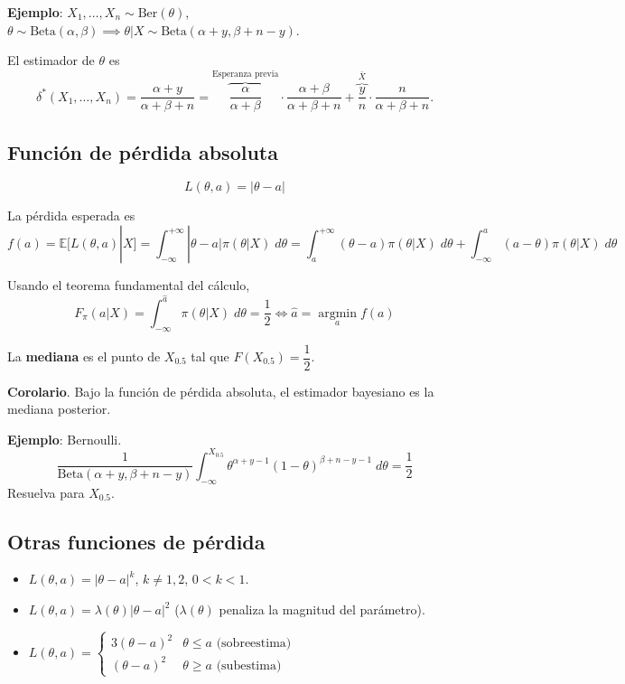 \documentclass[
  12pt,
]{book}
\begin{document}
\textbf{Ejemplo}: \(X_1,\dots, X_n \sim \text{Ber}(\theta)\), \(\theta \sim \text{Beta}(\alpha,\beta) \implies \theta|X \sim \text{Beta}(\alpha+y,\beta+n-y)\).

El estimador de \(\theta\) es
\[ \delta^*(X_1,\dots, X_n) = \dfrac{\alpha+y}{\alpha + \beta + n} = \overbrace{\dfrac{\alpha}{\alpha + \beta} }^{\text{Esperanza previa}}\cdot \dfrac{\alpha +\beta}{\alpha +\beta + n} + \overbrace{\dfrac{y}{n}}^{\bar X}\cdot \dfrac{n}{\alpha +\beta + n}.  \]

\hypertarget{funciuxf3n-de-puxe9rdida-absoluta}{%
\subsection{Función de pérdida absoluta}\label{funciuxf3n-de-puxe9rdida-absoluta}}

\[ L(\theta,a) = |\theta-a|\]

La pérdida esperada es
\[ f(a) = \mathbb{E}[L(\theta,a)|X] = \int_{-\infty}^{+\infty}|\theta-a|\pi(\theta|X)\;d\theta = \int_{a}^{+\infty}(\theta-a)\pi(\theta|X)\;d\theta + \int_{-\infty}^{a}(a-\theta)\pi(\theta|X)\;d\theta \]

Usando el teorema fundamental del cálculo,
\[F_{\pi}(a|X) = \int_{-\infty}^{\hat a}\pi(\theta|X)\;d\theta = \dfrac12 \Leftrightarrow \hat a= \operatorname*{argmin}_a f(a)\]

La \textbf{mediana} es el punto de \(X_{0.5}\) tal que \(F(X_{0.5}) = \dfrac{1}{2}\).

\textbf{Corolario}. Bajo la función de pérdida absoluta, el estimador bayesiano es la mediana posterior.

\textbf{Ejemplo}: Bernoulli.
\[ \dfrac{1}{\text{Beta}(\alpha+y, \beta+n-y)}\int_{-\infty}^{X_{0.5}}\theta^{\alpha+y-1} (1-\theta)^{\beta+n-y-1}\;d\theta = \dfrac12\]
Resuelva para \(X_{0.5}\).

\hypertarget{otras-funciones-de-puxe9rdida}{%
\subsection{Otras funciones de pérdida}\label{otras-funciones-de-puxe9rdida}}

\begin{itemize}
\item
  \(L(\theta,a) = |\theta-a|^k\), \(k\ne 1,2\), \(0<k<1\).
\item
  \(L(\theta,a) = \lambda(\theta)|\theta-a|^2\) (\(\lambda(\theta)\) penaliza la magnitud del parámetro).
\item
  \(L(\theta,a)=\begin{cases}3(\theta-a)^2 & \theta\leq a \text{ (sobreestima)}\\ (\theta-a)^2&\theta\geq a \text{ (subestima)} \end{cases}\)
\end{itemize}
\end{document}
